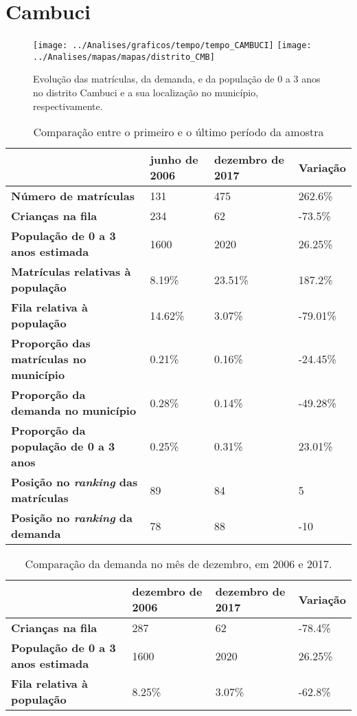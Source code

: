 \section{Cambuci}
\begin{figure}[H]
\centering
\texttt{[image: ../Analises/graficos/tempo/tempo\_CAMBUCI]}
\texttt{[image: ../Analises/mapas/mapas/distrito\_CMB]}
\caption{Evolução das matrículas, da demanda, e da população de 0 a 3 anos no distrito Cambuci e a sua localização no município, respectivamente.}
\end{figure}
\begin{table}[H]
\begin{tabular}{l|l|l|l}
\textbf{}                                      & \textbf{junho de 2006}       & \textbf{dezembro de 2017}    & \textbf{Variação} \\ \hline
\textbf{Número de matrículas}                  & 131 & 475 & 262.6\% \\ \hline
\textbf{Crianças na fila}                      & 234 & 62 & -73.5\% \\ \hline
\textbf{População de 0 a 3 anos estimada}      & 1600 & 2020 & 26.25\% \\ \hline
\textbf{Matrículas relativas à população}      & 8.19\% & 23.51\% & 187.2\% \\ \hline
\textbf{Fila relativa à população}             & 14.62\% & 3.07\% & -79.01\% \\ \hline
\textbf{Proporção das matrículas no município} & 0.21\% & 0.16\% & -24.45\% \\ \hline
\textbf{Proporção da demanda no município}     & 0.28\% & 0.14\% & -49.28\% \\ \hline
\textbf{Proporção da população de 0 a 3 anos}  & 0.25\% & 0.31\% & 23.01\% \\ \hline
\textbf{Posição no \textit{ranking} das matrículas}     & 89 & 84 & 5 \\ \hline
\textbf{Posição no \textit{ranking} da demanda}         & 78 & 88 & -10 \\ 
\end{tabular}
\caption{Comparação entre o primeiro e o último período da amostra}
\end{table}
\begin{table}[H]
\begin{tabular}{l|l|l|l}
\textbf{}                                 & \textbf{dezembro de 2006} & \textbf{dezembro de 2017} & \textbf{Variação} \\ \hline
\textbf{Crianças na fila}                      & 287 & 62 & -78.4\% \\ \hline
\textbf{População de 0 a 3 anos estimada}      & 1600 & 2020 & 26.25\% \\ \hline
\textbf{Fila relativa à população}             & 8.25\% & 3.07\% & -62.8\% \\
\end{tabular}
\caption{Comparação da demanda no mês de dezembro, em 2006 e 2017.}
\end{table}
